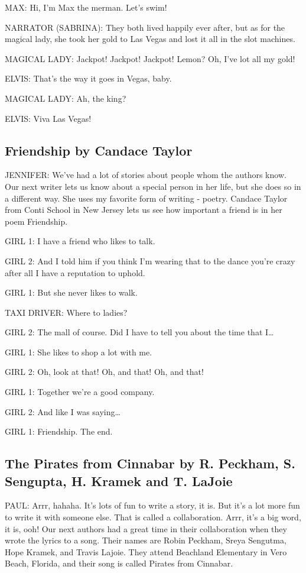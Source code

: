 MAX:
Hi, I'm Max the merman.
Let's swim!

NARRATOR (SABRINA):
They both lived happily ever after, but as for the magical lady, she took her gold to Las Vegas and lost it all in the slot machines.

MAGICAL LADY:
Jackpot!
Jackpot!
Jackpot!
Lemon?
Oh, I've lot all my gold!

ELVIS:
That's the way it goes in Vegas, baby.

MAGICAL LADY:
Ah, the king?

ELVIS:
Viva Las Vegas!

\subsection{Friendship by Candace Taylor}

JENNIFER:
We've had a lot of stories about people whom the authors know.
Our next writer lets us know about a special person in her life, but she does so in a different way.
She uses my favorite form of writing - poetry.
Candace Taylor from Conti School in New Jersey lets us see how important a friend is in her poem Friendship.

GIRL 1:
I have a friend who likes to talk.

GIRL 2:
And I told him if you think I'm wearing that to the dance you're crazy after all I have a reputation to uphold.

GIRL 1:
But she never likes to walk.

TAXI DRIVER:
Where to ladies?

GIRL 2:
The mall of course.
Did I have to tell you about the time that I\dots

GIRL 1:
She likes to shop a lot with me.

GIRL 2:
Oh, look at that!
Oh, and that!
Oh, and that!

GIRL 1:
Together we're a good company.

GIRL 2:
And like I was saying\dots

GIRL 1:
Friendship.
The end.

\subsection{The Pirates from Cinnabar by R.
    Peckham, S.
    Sengupta, H.
    Kramek and T.
    LaJoie}

PAUL:
Arrr, hahaha.
It's lots of fun to write a story, it is.
But it's a lot more fun to write it with someone else.
That is called a collaboration.
Arrr, it's a big word, it is, ooh!
Our next authors had a great time in their collaboration when they wrote the lyrics to a song.
Their names are Robin Peckham, Sreya Sengutma, Hope Kramek, and Travis Lajoie.
They attend Beachland Elementary in Vero Beach, Florida, and their song is called Pirates from Cinnabar.

